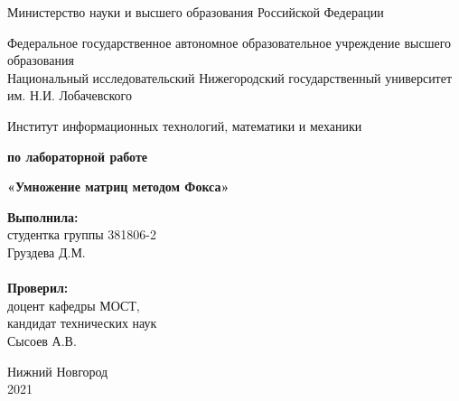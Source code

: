 \documentclass{report}
\begin{document}
\begin{titlepage}

\begin{center}
Министерство науки и высшего образования Российской Федерации
\end{center}

\begin{center}
Федеральное государственное автономное образовательное учреждение высшего образования \\
Национальный исследовательский Нижегородский государственный университет им. Н.И. Лобачевского
\end{center}

\begin{center}
Институт информационных технологий, математики и механики
\end{center}

\vspace{4em}

\begin{center}
\textbf{ по лабораторной работе} \\
\end{center}
\begin{center}
\textbf{\Large«Умножение матриц методом Фокса»} \\
\end{center}

\vspace{4em}

\newbox{\lbox}
\newlength{\maxl}
\setlength{\maxl}{\wd\lbox}
\hfill\parbox{7cm}{
\hspace*{5cm}\hspace*{-5cm}\textbf{Выполнила:} \\ студентка группы 381806-2 \\ Груздева Д.М.\\
\\
\hspace*{5cm}\hspace*{-5cm}\textbf{Проверил:}\\ доцент кафедры МОСТ, \\ кандидат технических наук \\ Сысоев А.В.\\
}
\vspace{\fill}

\begin{center} Нижний Новгород \\ 2021 \end{center}

\end{titlepage}
\end{document}
